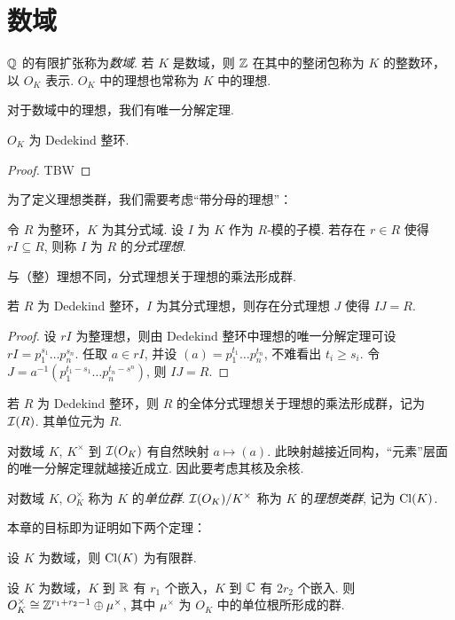 \section{数域}
\begin{defn}
  $\mathbb Q$ 的有限扩张称为\emph{数域}.  若 $K$ 是数域，则 $\mathbb Z$ 在其中的整闭包称为 $K$ 的整数环，以 $O_K$ 表示.  $O_K$ 中的理想也常称为 $K$ 中的理想.
\end{defn}
对于数域中的理想，我们有唯一分解定理.
\begin{thm}
  $O_K$ 为 Dedekind 整环.
\end{thm}
\begin{proof}
  TBW
\end{proof}
为了定义理想类群，我们需要考虑“带分母的理想”：
\begin{defn}
  令 $R$ 为整环，$K$ 为其分式域.  设 $I$ 为 $K$ 作为 $R$-模的子模.  若存在 $r \in R$ 使得 $rI \subseteq R$, 则称 $I$ 为 $R$ 的\emph{分式理想}.
\end{defn}
与（整）理想不同，分式理想关于理想的乘法形成群.
\begin{lemma}
  若 $R$ 为 Dedekind 整环，$I$ 为其分式理想，则存在分式理想 $J$ 使得 $IJ = R$.
\end{lemma}
\begin{proof}
  设 $rI$ 为整理想，则由 Dedekind 整环中理想的唯一分解定理可设 $rI = p_1^{s_1} \ldots p_n^{s_n}$.  任取 $a \in rI$, 并设 $(a) = p_1^{t_1} \ldots p_n^{t_n}$, 不难看出 $t_i \ge s_i$.  令 $J = a^{-1} (p_1^{t_1-s_1} \ldots p_n^{t_n-s^n})$, 则 $IJ = R$.
\end{proof}
\begin{prop}
  若 $R$ 为 Dedekind 整环，则 $R$ 的全体分式理想关于理想的乘法形成群，记为 $\mathcal I(R)$.  其单位元为 $R$.
\end{prop}
对数域 $K$, $K^\times$ 到 $\mathcal I(O_K)$ 有自然映射 $a \mapsto (a)$.  此映射越接近同构，“元素”层面的唯一分解定理就越接近成立.  因此要考虑其核及余核.
\begin{defn}
  对数域 $K$, $O_K^\times$ 称为 $K$ 的\emph{单位群}.  $\mathcal I(O_K) / K^\times$ 称为 $K$ 的\emph{理想类群}, 记为 $\operatorname{Cl}(K)$.
\end{defn}

本章的目标即为证明如下两个定理：
\begin{thm}
  设 $K$ 为数域，则 $\operatorname{Cl}(K)$ 为有限群.
\end{thm}
\begin{thm}
  设 $K$ 为数域，$K$ 到 $\mathbb R$ 有 $r_1$ 个嵌入，$K$ 到 $\mathbb C$ 有 $2r_2$ 个嵌入.  则 $O_K^\times \cong \mathbb Z^{r_1+r_2-1} \oplus \mu^\times$, 其中 $\mu^\times$ 为 $O_K$ 中的单位根所形成的群.
\end{thm}
